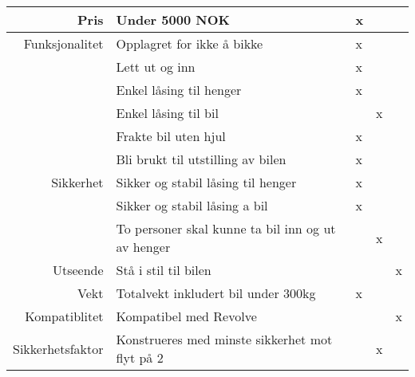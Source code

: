 \begin{tabular}{|r|l|l|l|l|}
	\hline
  		Pris & Under 5000 NOK & x &   &  \\ \hline
		Funksjonalitet  & Opplagret for ikke å bikke  & x &   & \\ \cline{2-5}
				& Lett ut og inn & x &   & \\ \cline{2-5}
				& Enkel låsing til henger & x &   & \\ \cline{2-5}
				& Enkel låsing til bil	&   & x & \\ \cline{2-5}
				& Frakte bil uten hjul & x &   & \\ \cline{2-5}
				& Bli brukt til utstilling av bilen & x &   & \\ \hline
		Sikkerhet	& Sikker og stabil låsing til henger & x &   & \\ \cline{2-5}
				& Sikker og stabil låsing a  bil & x &   & \\ \cline{2-5}
				& To personer skal kunne ta bil inn og ut av henger &   & x & \\ \hline
		Utseende	& Stå i stil til bilen  &    &   & x \\ \hline
		Vekt		& Totalvekt inkludert bil under 300kg & x &   & \\ \hline
		Kompatiblitet 	& Kompatibel med Revolve &   &   & x \\ \hline
		Sikkerhetsfaktor	& Konstrueres med minste sikkerhet mot flyt på 2 &    & x & \\ \hline
\end{tabular}

